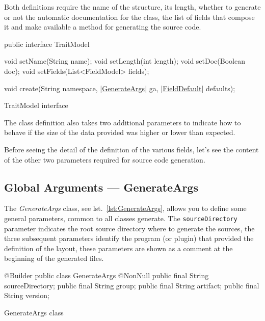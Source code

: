 Both definitions require the name of the structure, its length, whether to 
generate or not the automatic documentation for the class, the list of fields 
that compose it and make available a method for generating the source code.

\begin{elisting}[!htb]
\begin{javacode}
public interface TraitModel {
    void setName(String name);
    void setLength(int length);
    void setDoc(Boolean doc);
    void setFields(List<FieldModel> fields);

    void create(String namespace, |\hyperref[lst:GenerateArgs]{GenerateArgs}| ga, |\hyperref[lst:FieldDefault]{FieldDefault}| defaults);
}
\end{javacode}
\caption{TraitModel interface}
\label{lst:TraitModel}
\end{elisting}
The class definition also takes two additional parameters to indicate how to 
behave if the size of the data provided was higher or lower than expected.

Before seeing the detail of the definition of the various fields, let's see the 
content of the other two parameters required for source code generation.

\subsection{Global Arguments --- GenerateArgs}
The \textsl{GenerateArgs} class, see lst.~\ref{lst:GenerateArgs}, allows you to 
define some general parameters, common to all classes generate. 
The \texttt{sourceDirectory} parameter indicates the root source directory where
to generate the sources, the three subsequent parameters identify the program 
(or plugin) that provided the definition of the layout, these parameters are 
shown as a comment at the beginning of the generated files.

\begin{elisting}[!htb]
\begin{javacode}
@Builder
public class GenerateArgs {
    @NonNull public final String sourceDirectory;
    public final String group;
    public final String artifact;
    public final String version;
}
\end{javacode}
\caption{GenerateArgs class}
\label{lst:GenerateArgs}
\end{elisting}

